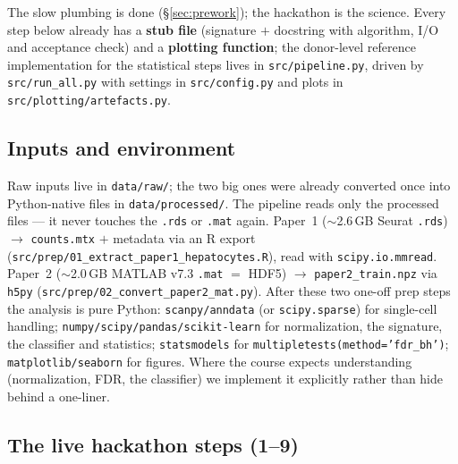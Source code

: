 \documentclass[11pt]{article}
\newcommand{\code}[1]{\texttt{#1}}
\begin{document}
The slow plumbing is done (\S\ref{sec:prework}); the hackathon is the science. Every step below already
has a \textbf{stub file} (signature $+$ docstring with algorithm, I/O and acceptance check) and a
\textbf{plotting function}; the donor-level reference implementation for the statistical steps lives in
\code{src/pipeline.py}, driven by \code{src/run\_all.py} with settings in \code{src/config.py} and
plots in \code{src/plotting/artefacts.py}.

\subsection{Inputs and environment}

Raw inputs live in \code{data/raw/}; the two big ones were already converted once into Python-native
files in \code{data/processed/}. The pipeline reads only the processed files --- it never touches the
\code{.rds} or \code{.mat} again. Paper~1 ($\sim$2.6\,GB Seurat \code{.rds}) $\to$ \code{counts.mtx} $+$
metadata via an R export (\code{src/prep/01\_extract\_paper1\_hepatocytes.R}), read with
\code{scipy.io.mmread}. Paper~2 ($\sim$2.0\,GB MATLAB v7.3 \code{.mat} $=$ HDF5) $\to$
\code{paper2\_train.npz} via \code{h5py} (\code{src/prep/02\_convert\_paper2\_mat.py}). After these two
one-off prep steps the analysis is pure Python: \code{scanpy/anndata} (or \code{scipy.sparse}) for
single-cell handling; \code{numpy/scipy/pandas/scikit-learn} for normalization, the signature, the
classifier and statistics; \code{statsmodels} for \code{multipletests(method='fdr\_bh')};
\code{matplotlib/seaborn} for figures. Where the course expects understanding (normalization, FDR, the
classifier) we implement it explicitly rather than hide behind a one-liner.

\subsection{The live hackathon steps (1--9)}
\end{document}
